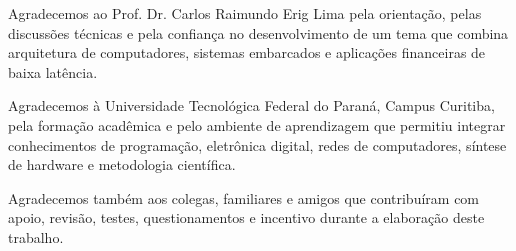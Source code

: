
\begin{agradecimentos}%

Agradecemos ao Prof. Dr. Carlos Raimundo Erig Lima pela orientação, pelas discussões técnicas e pela confiança no desenvolvimento de um tema que combina arquitetura de computadores, sistemas embarcados e aplicações financeiras de baixa latência.

Agradecemos à Universidade Tecnológica Federal do Paraná, Campus Curitiba, pela formação acadêmica e pelo ambiente de aprendizagem que permitiu integrar conhecimentos de programação, eletrônica digital, redes de computadores, síntese de hardware e metodologia científica.

Agradecemos também aos colegas, familiares e amigos que contribuíram com apoio, revisão, testes, questionamentos e incentivo durante a elaboração deste trabalho.

\end{agradecimentos}
